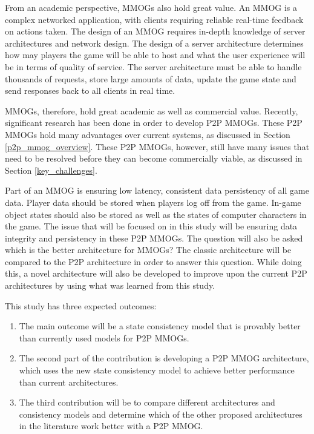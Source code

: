 \documentclass[journal,oneside,a4paper,onecolumn]{IEEEtran}
\begin{document}
From an academic perspective, \acp{MMOG} also hold great value. An MMOG is a complex networked application, with clients requiring reliable real-time feedback on actions taken. The design of an MMOG requires in-depth knowledge of server architectures and network design. The design of a server architecture determines how may players the game will be able to host and what the user experience will be in terms of quality of service. The server architecture must be able to handle thousands of requests, store large amounts of data, update the game state and send responses back to all clients in real time.

MMOGs, therefore, hold great academic as well as commercial value. Recently, significant research has been done in order to develop \ac{P2P} MMOGs. These P2P MMOGs hold many advantages over current systems, as discussed in Section \ref{p2p_mmog_overview}. These \ac{P2P} MMOGs, however, still have many issues that need to be resolved before they can become commercially viable, as discussed in Section \ref{key_challenges}.

Part of an MMOG is ensuring low latency, consistent data persistency of all game data. Player data should be stored when players log off from the game. In-game object states should also be stored as well as the states of computer characters in the game. The issue that will be focused on in this study will be ensuring data integrity and persistency in these P2P MMOGs. The question will also be asked which is the better architecture for MMOGs? The classic architecture will be compared to the P2P architecture in order to answer this question. While doing this, a novel architecture will also be developed to improve upon the current P2P architectures by using what was learned from this study.

This study has three expected outcomes:
%
\begin{enumerate}
    \item The main outcome will be a state consistency model that is provably better than currently used models for P2P MMOGs.
    \item The second part of the contribution is developing a P2P MMOG architecture, which uses the new state consistency model to achieve better performance than current architectures.
    \item The third contribution will be to compare different architectures and consistency models and determine which of the other proposed architectures in the literature work better with a P2P MMOG.
\end{enumerate}
\end{document}

